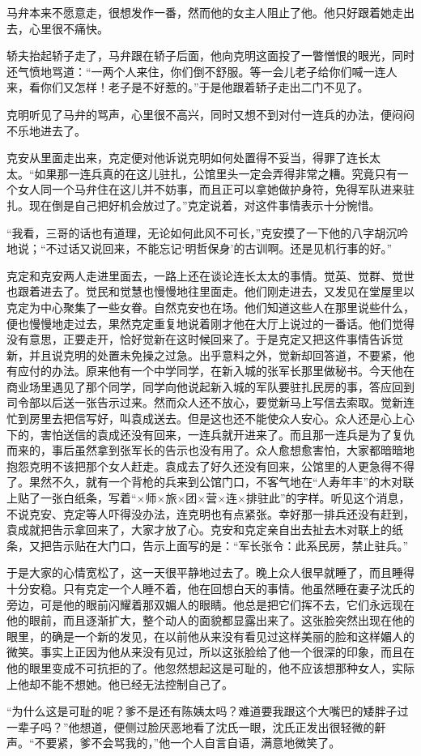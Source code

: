 \par 马弁本来不愿意走，很想发作一番，然而他的女主人阻止了他。他只好跟着她走出去，心里很不痛快。
\par 轿夫抬起轿子走了，马弁跟在轿子后面，他向克明这面投了一瞥憎恨的眼光，同时还气愤地骂道：“一两个人来住，你们倒不舒服。等一会儿老子给你们喊一连人来，看你们又怎样！老子是不好惹的。”于是他跟着轿子走出二门不见了。
\par 克明听见了马弁的骂声，心里很不高兴，同时又想不到对付一连兵的办法，便闷闷不乐地进去了。
\par 克安从里面走出来，克定便对他诉说克明如何处置得不妥当，得罪了连长太太。“如果那一连兵真的在这儿驻扎，公馆里头一定会弄得非常之糟。究竟只有一个女人同一个马弁住在这儿并不妨事，而且正可以拿她做护身符，免得军队进来驻扎。现在倒是自己把好机会放过了。”克定说着，对这件事情表示十分惋惜。
\par “我看，三哥的话也有道理，无论如何此风不可长，”克安摸了一下他的八字胡沉吟地说；“不过话又说回来，不能忘记‘明哲保身’的古训啊。还是见机行事的好。”
\par 克定和克安两人走进里面去，一路上还在谈论连长太太的事情。觉英、觉群、觉世也跟着进去了。觉民和觉慧也慢慢地往里面走。他们刚走进去，又发见在堂屋里以克定为中心聚集了一些女眷。自然克安也在场。他们知道这些人在那里说些什么，便也慢慢地走过去，果然克定重复地说着刚才他在大厅上说过的一番话。他们觉得没有意思，正要走开，恰好觉新在这时候回来了。于是克定又把这件事情告诉觉新，并且说克明的处置未免操之过急。出乎意料之外，觉新却回答道，不要紧，他有应付的办法。原来他有一个中学同学，在新入城的张军长那里做秘书。今天他在商业场里遇见了那个同学，同学向他说起新入城的军队要驻扎民房的事，答应回到司令部以后送一张告示过来。然而众人还不放心，要觉新马上写信去索取。觉新连忙到房里去把信写好，叫袁成送去。但是这也还不能使众人安心。众人还是心上心下的，害怕送信的袁成还没有回来，一连兵就开进来了。而且那一连兵是为了复仇而来的，事后虽然拿到张军长的告示也没有用了。众人愈想愈害怕，大家都暗暗地抱怨克明不该把那个女人赶走。袁成去了好久还没有回来，公馆里的人更急得不得了。果然不久，就有一个背枪的兵来到公馆门口，不客气地在“人寿年丰”的木对联上贴了一张白纸条，写着“×师×旅×团×营×连×排驻此”的字样。听见这个消息，不说克安、克定等人吓得没办法，连克明也有点紧张。幸好那一排兵还没有赶到，袁成就把告示拿回来了，大家才放了心。克安和克定亲自出去扯去木对联上的纸条，又把告示贴在大门口，告示上面写的是：“军长张令：此系民房，禁止驻兵。”
\par 于是大家的心情宽松了，这一天很平静地过去了。晚上众人很早就睡了，而且睡得十分安稳。只有克定一个人睡不着，他在回想白天的事情。他虽然睡在妻子沈氏的旁边，可是他的眼前闪耀着那双媚人的眼睛。他总是把它们挥不去，它们永远现在他的眼前，而且逐渐扩大，整个动人的面貌都显露出来了。这张脸突然出现在他的眼里，的确是一个新的发见，在以前他从来没有看见过这样美丽的脸和这样媚人的微笑。事实上正因为他从来没有见过，所以这张脸给了他一个很深的印象，而且在他的眼里变成不可抗拒的了。他忽然想起这是可耻的，他不应该想那种女人，实际上他却不能不想她。他已经无法控制自己了。
\par “为什么这是可耻的呢？爹不是还有陈姨太吗？难道要我跟这个大嘴巴的矮胖子过一辈子吗？”他想道，便侧过脸厌恶地看了沈氏一眼，沈氏正发出很轻微的鼾声。“不要紧，爹不会骂我的，”他一个人自言自语，满意地微笑了。


